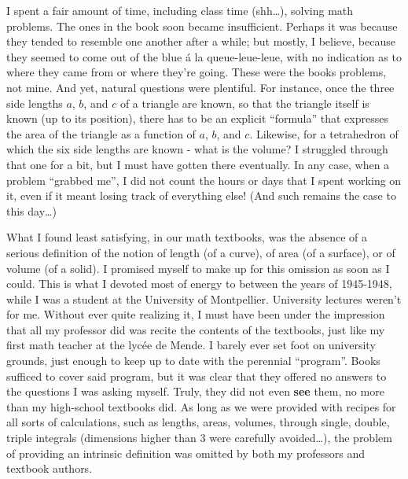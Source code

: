 I spent a fair amount of time, including class time (shh\ldots), solving math problems.
The ones in the book soon became insufficient. Perhaps it was because they tended to
resemble one another after a while; but mostly, I believe, because they seemed
to come out of the blue \'a la queue-leue-leue,
with no indication as to where they came from or where they're going.
These were the books problems, not mine. And yet, natural questions were plentiful. For
instance, once the three side lengths $a$, $b$, and $c$ of a triangle are known, so that the
triangle itself is known (up to its position), there has to be an explicit ``formula''
that expresses the area of the triangle as a function of $a$, $b$, and $c$. Likewise, for
a tetrahedron of which the six side lengths are known - what is the volume? I struggled
through that one for a bit, but I must have gotten there eventually. In any case, when a
problem ``grabbed me'', I did not count the hours or days that I spent working on it, 
even if it meant losing track of everything else! (And such remains the case to this
day\ldots)

What I found least satisfying, in our math textbooks, was the absence of 
a serious definition of the notion of length (of a curve), of area (of a surface), or of
volume (of a solid). I promised myself to make up for this omission as soon as I could. 
This is what I devoted most of energy to between the years of 1945-1948, while I was a
student at the University of Montpellier. University lectures weren't for me. Without ever
quite realizing it, 
I must have been under the impression 
that all my professor did was recite the contents
of the textbooks, just like my first math teacher at the lyc\'ee de Mende.
I barely ever set foot on university grounds, just enough to keep up to date with 
the perennial ``program''. Books sufficed to cover said program, but it was clear that
they offered no answers to the questions I was asking myself. Truly, they did not even
\textbf{see} them, no more than my high-school textbooks did. As long as we were provided
with recipes for all sorts of calculations, such as lengths, areas, volumes, through single,
double, triple integrals (dimensions higher than 3 were carefully avoided\ldots), the
problem of providing an intrinsic definition was omitted by both my professors and
textbook authors. 


